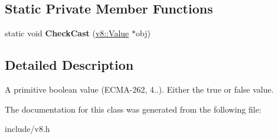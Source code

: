 \subsection*{Static Private Member Functions}
\begin{DoxyCompactItemize}
\item 
static void {\bfseries Check\+Cast} (\hyperlink{classv8_1_1_value}{v8\+::\+Value} $\ast$obj)\hypertarget{classv8_1_1_boolean_ae8e7c3ba7105247904cb12dfa13d13af}{}\label{classv8_1_1_boolean_ae8e7c3ba7105247904cb12dfa13d13af}

\end{DoxyCompactItemize}


\subsection{Detailed Description}
A primitive boolean value (E\+C\+M\+A-\/262, 4..). Either the true or false value. 

The documentation for this class was generated from the following file\+:\begin{DoxyCompactItemize}
\item 
include/v8.\+h\end{DoxyCompactItemize}
